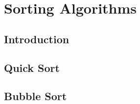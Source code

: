 \documentclass[../alevelmaths.tex]{subfiles}
\begin{document}
\chapter{Sorting Algorithms}
\section{Introduction}
\section{Quick Sort}
\section{Bubble Sort}
\end{document}
